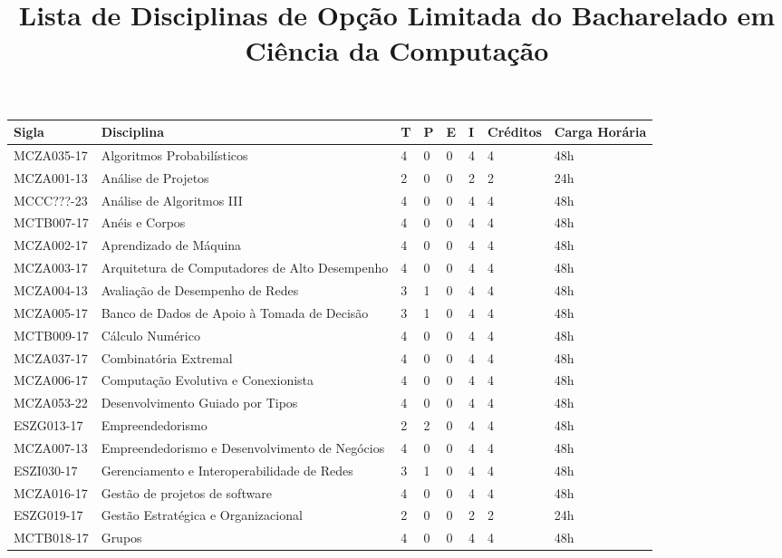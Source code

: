 \documentclass[a4paper]{article}
\title{Lista de Disciplinas de Opção Limitada do Bacharelado em Ciência da Computação}
\author{}
\date{}
\begin{document}
\maketitle

\begin{longtable}{|l|l|llll|l|l|}\hline\endhead\hline\endfoot
\textbf{Sigla} & \textbf{Disciplina} & \textbf{T} & \textbf{P} & \textbf{E} & \textbf{I} & \textbf{Créditos} & \textbf{Carga Horária} \\ \hline\hline
%
MCZA035-17 & Algoritmos Probabilísticos & 4 & 0 & 0 & 4 & 4 & 48h \\
MCZA001-13 & Análise de Projetos & 2 & 0 & 0 & 2 & 2 & 24h \\
MCCC???-23 & Análise de Algoritmos III & 4 & 0 & 0 & 4 & 4 & 48h \\ %
MCTB007-17 & Anéis e Corpos & 4 & 0 & 0 & 4 & 4 & 48h \\
MCZA002-17 & Aprendizado de Máquina & 4 & 0 & 0 & 4 & 4 & 48h \\
MCZA003-17 & Arquitetura de Computadores de Alto Desempenho & 4 & 0 & 0 & 4 & 4 & 48h \\
MCZA004-13 & Avaliação de Desempenho de Redes & 3 & 1 & 0 & 4 & 4 & 48h \\
MCZA005-17 & Banco de Dados de Apoio à Tomada de Decisão & 3 & 1 & 0 & 4 & 4 & 48h \\
MCTB009-17 & Cálculo Numérico & 4 & 0 & 0 & 4 & 4 & 48h \\
MCZA037-17 & Combinatória Extremal & 4 & 0 & 0 & 4 & 4 & 48h \\
MCZA006-17 & Computação Evolutiva e Conexionista & 4 & 0 & 0 & 4 & 4 & 48h \\
MCZA053-22 & Desenvolvimento Guiado por Tipos & 4 & 0 & 0 & 4 & 4 & 48h \\
ESZG013-17 & Empreendedorismo & 2 & 2 & 0 & 4 & 4 & 48h \\
MCZA007-13 & Empreendedorismo e Desenvolvimento de Negócios & 4 & 0 & 0 & 4 & 4 & 48h \\
ESZI030-17 & Gerenciamento e Interoperabilidade de Redes & 3 & 1 & 0 & 4 & 4 & 48h \\
MCZA016-17 & Gestão de projetos de software & 4 & 0 & 0 & 4 & 4 & 48h \\
ESZG019-17 & Gestão Estratégica e Organizacional & 2 & 0 & 0 & 2 & 2 & 24h \\
MCTB018-17 & Grupos & 4 & 0 & 0 & 4 & 4 & 48h \\

\end{longtable}
\end{document}
